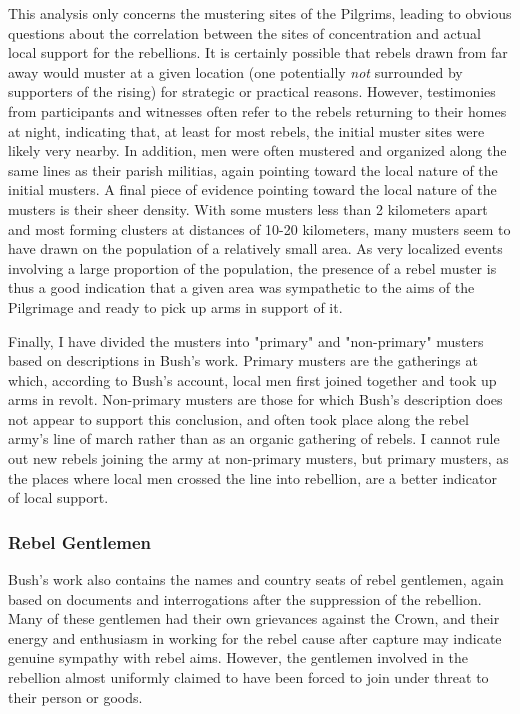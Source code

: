 \documentclass[12pt]{article}
\begin{document}
This analysis only concerns the mustering sites of the Pilgrims, leading to obvious questions about the correlation between the sites of concentration and actual local support for the rebellions. It is certainly possible that rebels drawn from far away would muster at a given location (one potentially \emph{not} surrounded by supporters of the rising) for strategic or practical reasons. However, testimonies from participants and witnesses often refer to the rebels returning to their homes at night, indicating that, at least for most rebels, the initial muster sites were likely very nearby.\autocite[120]{Hoyle2001} In addition, men were often mustered and organized along the same lines as their parish militias, again pointing toward the local nature of the initial musters.\autocite[30-1]{Bush1996} A final piece of evidence pointing toward the local nature of the musters is their sheer density. With some musters less than 2 kilometers apart and most forming clusters at distances of 10-20 kilometers, many musters seem to have drawn on the population of a relatively small area. As very localized events involving a large proportion of the population, the presence of a rebel muster is thus a good indication that a given area was sympathetic to the aims of the Pilgrimage and ready to pick up arms in support of it.

Finally, I have divided the musters into "primary" and "non-primary" musters based on descriptions in Bush's work. Primary musters are the gatherings at which, according to Bush's account, local men first joined together and took up arms in revolt. Non-primary musters are those for which Bush's description does not appear to support this conclusion, and often took place along the rebel army's line of march rather than as an organic gathering of rebels. I cannot rule out new rebels joining the army at non-primary musters, but primary musters, as the places where local men crossed the line into rebellion, are a better indicator of local support.

\subsubsection{Rebel Gentlemen}

Bush's work also contains the names and country seats of rebel gentlemen, again based on documents and interrogations after the suppression of the rebellion. Many of these gentlemen had their own grievances against the Crown, and their energy and enthusiasm in working for the rebel cause after capture may indicate genuine sympathy with rebel aims.\autocite[133]{Bush1996} However, the gentlemen involved in the rebellion almost uniformly claimed to have been forced to join under threat to their person or goods.\autocite[193]{Bush1996} 
\end{document}
